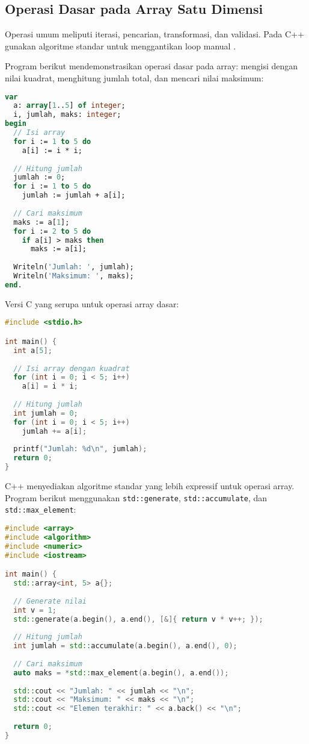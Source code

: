 \documentclass[../main.tex]{subfiles}
\begin{document}
\subsection{Operasi Dasar pada Array Satu Dimensi}
Operasi umum meliputi iterasi, pencarian, transformasi, dan validasi. Pada C++ gunakan algoritme standar untuk menggantikan loop manual \parencite{cppreference-algorithm,gnu-c-manual}.

Program berikut mendemonstrasikan operasi dasar pada array: mengisi dengan nilai kuadrat, menghitung jumlah total, dan mencari nilai maksimum:

\begin{lstlisting}[language=Pascal, caption={Operasi dasar array di Pascal}]
var
  a: array[1..5] of integer;
  i, jumlah, maks: integer;
begin
  // Isi array
  for i := 1 to 5 do
    a[i] := i * i;
    
  // Hitung jumlah
  jumlah := 0;
  for i := 1 to 5 do
    jumlah := jumlah + a[i];
    
  // Cari maksimum
  maks := a[1];
  for i := 2 to 5 do
    if a[i] > maks then
      maks := a[i];
      
  Writeln('Jumlah: ', jumlah);
  Writeln('Maksimum: ', maks);
end.
\end{lstlisting}

Versi C yang serupa untuk operasi array dasar:

\begin{lstlisting}[language=C, caption={Operasi dasar array di C}]
#include <stdio.h>

int main() {
  int a[5];
  
  // Isi array dengan kuadrat
  for (int i = 0; i < 5; i++)
    a[i] = i * i;
  
  // Hitung jumlah
  int jumlah = 0;
  for (int i = 0; i < 5; i++)
    jumlah += a[i];
    
  printf("Jumlah: %d\n", jumlah);
  return 0;
}
\end{lstlisting}

C++ menyediakan algoritme standar yang lebih expressif untuk operasi array. Program berikut menggunakan \texttt{std::generate}, \texttt{std::accumulate}, dan \texttt{std::max\_element}:

\begin{lstlisting}[language=C++, caption={Operasi dengan std::array dan algoritme}]
#include <array>
#include <algorithm>
#include <numeric>
#include <iostream>

int main() {
  std::array<int, 5> a{};
  
  // Generate nilai
  int v = 1;
  std::generate(a.begin(), a.end(), [&]{ return v * v++; });
  
  // Hitung jumlah
  int jumlah = std::accumulate(a.begin(), a.end(), 0);
  
  // Cari maksimum
  auto maks = *std::max_element(a.begin(), a.end());
  
  std::cout << "Jumlah: " << jumlah << "\n";
  std::cout << "Maksimum: " << maks << "\n";
  std::cout << "Elemen terakhir: " << a.back() << "\n";
  
  return 0;
}
\end{lstlisting}
\end{document}
